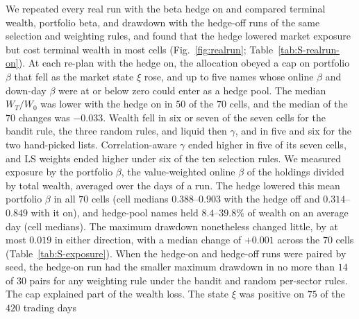 We repeated every real run with the beta hedge on and compared terminal wealth, portfolio beta, and drawdown with
the hedge-off runs of the same selection and weighting rules, and found that the hedge lowered market exposure but
cost terminal wealth in most cells (Fig.~\ref{fig:realrun}; Table~\ref{tab:S-realrun-on}). At each re-plan with the
hedge on, the allocation obeyed a cap on portfolio $\beta$ that fell as the market state $\xi$ rose, and up to five
names whose online $\beta$ and down-day $\beta$ were at or below zero could enter as a hedge pool. The median
$W_T/W_0$ was lower with the hedge on in $50$ of the $70$ cells, and the median of the $70$ changes was $-0.033$.
Wealth fell in six or seven of the seven cells for the bandit rule, the three random rules, and liquid then
$\gamma$, and in five and six for the two hand-picked lists. Correlation-aware $\gamma$ ended higher in five of its
seven cells, and LS weights ended higher under six of the ten selection rules.
We measured exposure by the portfolio $\beta$, the value-weighted online $\beta$ of the holdings divided by total
wealth, averaged over the days of a run. The hedge lowered this mean portfolio $\beta$ in all $70$ cells (cell
medians $0.388$--$0.903$ with the hedge off and $0.314$--$0.849$ with it on), and hedge-pool names held
$8.4$--$39.8\%$ of wealth on an average day (cell medians). The maximum drawdown nonetheless changed little, by at
most $0.019$ in either direction, with a median change of $+0.001$ across the $70$ cells
(Table~\ref{tab:S-exposure}).
When the hedge-on and hedge-off runs were paired by seed, the hedge-on run had the smaller maximum drawdown in no
more than $14$ of $30$ pairs for any weighting rule under the bandit and random per-sector rules.
The cap explained part of the wealth loss. The state $\xi$ was positive on $75$ of the $420$ trading days
